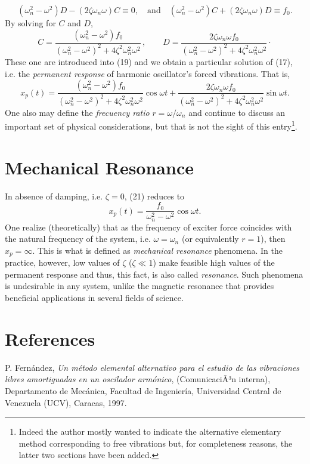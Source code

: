 \documentclass[12pt]{article}
\begin{document}
\begin{equation*}
(\omega_n^2-\omega^2)D-(2\zeta\omega_n\omega)C\equiv 0,\quad \textrm{and}\quad
(\omega_n^2-\omega^2)C+(2\zeta\omega_n\omega)D\equiv f_0.
\end{equation*}
By solving for $C$ and $D$,
\begin{equation*}
C=\frac{(\omega_n^2-\omega^2)f_0}{(\omega_n^2-\omega^2)^2+ 4\zeta^2\omega_n^2\omega^2}\,,\qquad
D=\frac{2\zeta\omega_n\omega f_0}{(\omega_n^2-\omega^2)^2+ 4\zeta^2\omega_n^2\omega^2}\cdot
\end{equation*}
These one are introduced into (19) and we obtain a particular solution of (17), i.e. the \emph{permanent response} of harmonic oscillator's forced vibrations. That is,
\begin{equation}
x_p(t)=\frac{(\omega_n^2-\omega^2)f_0}{(\omega_n^2-\omega^2)^2+ 4\zeta^2\omega_n^2\omega^2}\cos\omega t
+\frac{2\zeta\omega_n\omega f_0}{(\omega_n^2-\omega^2)^2+ 4\zeta^2\omega_n^2\omega^2}\sin\omega t.
\end{equation}
One also may define the \emph{frecuency ratio} $r=\omega/\omega_n$ and continue to discuss an important set of physical considerations, but that is not the sight of this entry{\footnote{Indeed the author mostly wanted to indicate the alternative elementary  method corresponding to free vibrations but, for completeness reasons, the latter two sections have been added.}}.
\section{Mechanical Resonance}
In absence of damping, i.e. $\zeta=0$, (21) reduces to
\begin{equation}
x_p(t)=\frac{f_0}{\omega_n^2-\omega^2}\cos\omega t.
\end{equation}
One realize (theoretically) that as the frequency of exciter force coincides with the natural frequency of the system, i.e. $\omega=\omega_n$ (or equivalently $r=1$), then $x_p=\infty$. This is what is defined as  \emph{mechanical resonance} phenomena. In the practice, however, low values of $\zeta$ ($\zeta\ll 1$) make feasible high values of the permanent response and thus, this fact, is also called \emph{resonance}. Such phenomena is undesirable in any system, unlike the magnetic resonance that provides beneficial applications in several fields of science. 
\section{References}
P. Fern\'andez, \emph{ Un m\'etodo elemental alternativo para el estudio de las vibraciones libres amortiguadas en un oscilador arm\'onico}, (ComunicaciÃ³n interna), Departamento de Mec\'anica, Facultad de Ingenier\'ia, Universidad Central de Venezuela (UCV), Caracas, 1997. 




 



 














 

 



\end{document}
